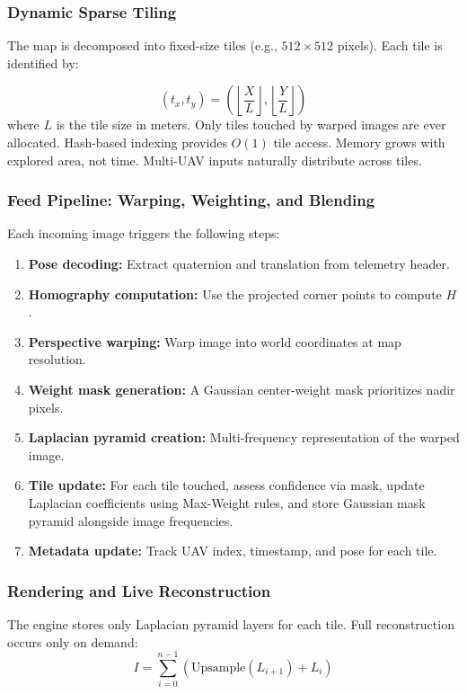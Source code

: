 \documentclass[conference]{IEEEtran}
\begin{document}
\subsubsection{Dynamic Sparse Tiling}
The map is decomposed into fixed-size tiles (e.g., $512 \times 512$ pixels). Each tile is identified by:

\begin{equation}
(t_x, t_y) = \left( \left\lfloor \frac{X}{L} \right\rfloor, \left\lfloor \frac{Y}{L} \right\rfloor \right)
\end{equation}
where $L$ is the tile size in meters. Only tiles touched by warped images are ever allocated. Hash-based indexing provides $O(1)$ tile access. Memory grows with explored area, not time. Multi-UAV inputs naturally distribute across tiles.

\subsubsection{Feed Pipeline: Warping, Weighting, and Blending}
Each incoming image triggers the following steps:
\begin{enumerate}
    \item \textbf{Pose decoding:} Extract quaternion and translation from telemetry header.
    \item \textbf{Homography computation:} Use the projected corner points to compute $H$.
    \item \textbf{Perspective warping:} Warp image into world coordinates at map resolution.
    \item \textbf{Weight mask generation:} A Gaussian center-weight mask prioritizes nadir pixels.
    \item \textbf{Laplacian pyramid creation:} Multi-frequency representation of the warped image.
    \item \textbf{Tile update:} For each tile touched, assess confidence via mask, update Laplacian coefficients using Max-Weight rules, and store Gaussian mask pyramid alongside image frequencies.
    \item \textbf{Metadata update:} Track UAV index, timestamp, and pose for each tile.
\end{enumerate}

\subsubsection{Rendering and Live Reconstruction}
The engine stores only Laplacian pyramid layers for each tile. Full reconstruction occurs only on demand:
\begin{equation}
I = \sum_{i=0}^{n-1} \left( \text{Upsample}(L_{i+1}) + L_i \right)
\end{equation}
\end{document}
